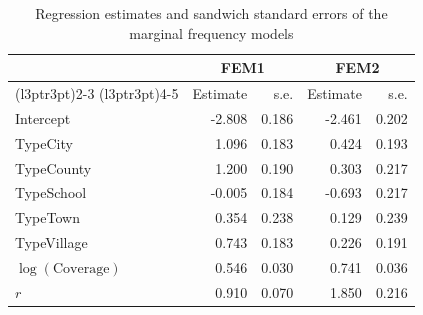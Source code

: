 \documentclass[11pt]{article}
\newcommand{\rev}[1]{{\color{blue}#1}}
\begin{document}
{\begin{table}[!h]
\centering
\begin{tabular}[t]{lrrrr}
\toprule
\multicolumn{1}{c}{ } & \multicolumn{2}{c}{FEM1} & \multicolumn{2}{c}{FEM2} \\
\cmidrule(l{3pt}r{3pt}){2-3} \cmidrule(l{3pt}r{3pt}){4-5}
  & Estimate & s.e. & Estimate & s.e.\\
\midrule
Intercept & -2.808 & 0.186 & -2.461 & 0.202 \\
TypeCity & 1.096 & 0.183 & 0.424 & 0.193 \\
TypeCounty & 1.200 & 0.190 & 0.303 & 0.217 \\
TypeSchool & -0.005 & 0.184 & -0.693 & 0.217 \\
TypeTown & 0.354 & 0.238 & 0.129 & 0.239 \\
TypeVillage & 0.743 & 0.183 & 0.226 & 0.191 \\
$\log(\mathrm{Coverage})$ & 0.546 & 0.030 & 0.741 & 0.036 \\
$r$ & 0.910 & 0.070 & 1.850 & 0.216 \\
\bottomrule
\end{tabular}
\caption{Regression estimates {and sandwich standard errors} of the marginal frequency models}
\label{tab:MFreq_LGPIF}
\end{table}


}
\end{document}
